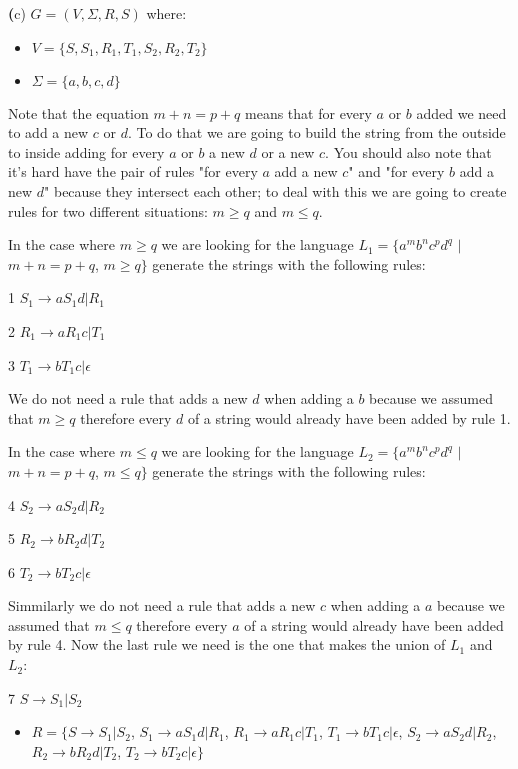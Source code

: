 \documentclass[11pt]{article}
\renewcommand{\part}[1] {{\vspace{0.15in}\noindent\textbf (#1)} \vspace{0.10in}}
\begin{document}
\part{c} $G = (V, \Sigma, R, S)$ where:
\begin{itemize}
    \item{$V = \{S, S_1, R_1, T_1, S_2, R_2, T_2\}$}
    \item{$\Sigma = \{a, b, c, d\}$}
\end{itemize}
    
    \par Note that the equation $m + n = p + q$ means that for every $a$ or $b$ added we need to add a new $c$ or $d$. To do that we are going to build the string from the outside to inside adding for every $a$ or $b$ a new $d$ or a new $c$. You should also note that it's hard have the pair of rules "for every $a$ add a new $c$" and "for every $b$ add a new $d$" because they intersect each other; to deal with this we are going to create rules for two different situations: $m \geq q$ and $m \leq q$.
    \par In the case where $m \geq q$ we are looking for the language $L_1 = \{a^mb^nc^pd^q$ $|$ $m + n = p + q$, $m \geq q\} $ generate the strings with the following rules:
    \par 1 $S_1 \rightarrow aS_1d | R_1$
    \par 2 $R_1 \rightarrow aR_1c | T_1$
    \par 3 $T_1 \rightarrow bT_1c | \epsilon$
    \par We do not need a rule that adds a new $d$ when adding a $b$ because we assumed that $m \geq q$ therefore every $d$ of a string would already have been added by rule 1.
    \par In the case where $m \leq q$ we are looking for the language $L_2 = \{a^mb^nc^pd^q$ $|$ $m + n = p + q$, $m \leq q\} $ generate the strings with the following rules:
    \par 4 $S_2 \rightarrow aS_2d | R_2$
    \par 5 $R_2 \rightarrow bR_2d | T_2$
    \par 6 $T_2 \rightarrow bT_2c | \epsilon$
    \par Simmilarly we do not need a rule that adds a new $c$ when adding a $a$ because we assumed that $m \leq q$ therefore every $a$ of a string would already have been added by rule 4.
    Now the last rule we need is the one that makes the union of $L_1$ and $L_2$: 
    \par 7 $S \rightarrow S_1 | S_2$
\begin{itemize}    
    \item{$R = \{S \rightarrow S_1 | S_2$, 
        $S_1 \rightarrow aS_1d | R_1$,
        $R_1 \rightarrow aR_1c | T_1$,
        $T_1 \rightarrow bT_1c | \epsilon$,
        $S_2 \rightarrow aS_2d | R_2$,
        $R_2 \rightarrow bR_2d | T_2$,
        $T_2 \rightarrow bT_2c | \epsilon\}$
      }
\end{itemize}
\end{document}
